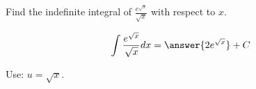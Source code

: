 \documentclass{ximera}
\author{Gregory Hartman \and Matthew Carr\and Nela Lakos}
\begin{document}
\begin{exercise}

Find the indefinite integral of $\frac{e^{\sqrt{x}}}{\sqrt{x}}$ with respect to $x$.

\[
\int \frac{e^{\sqrt{x}}}{\sqrt{x}} dx=\answer{2e^{\sqrt{x}}}+C
\]
\begin{hint}
Use: $u=\sqrt{x}$.
\end{hint}
\end{exercise}
\end{document}
